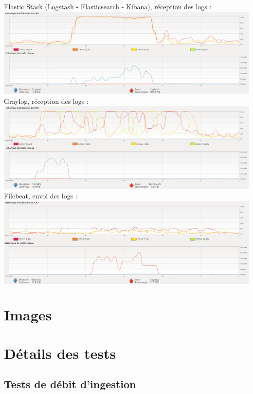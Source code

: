 \documentclass[paper=a4, fontsize=11pt]{scrartcl}
\begin{document}
Elastic Stack (Logstash - Elasticsearch - Kibana), réception des logs :\\
\includegraphics[width=19cm]{img/screenshots/Elastic_CPU_MEM_Receive_modified.png}
Graylog, réception des logs :\\
\includegraphics[width=19cm]{img/screenshots/Graylog_CPU_MEM_Receive_modified.png}
Filebeat, envoi des logs :\\
\includegraphics[width=19cm]{img/screenshots/Filebeat_send_modified.png}



\appendix

\section{Images}

\section{Détails des tests}

\subsection{Tests de débit d'ingestion}
\end{document}
